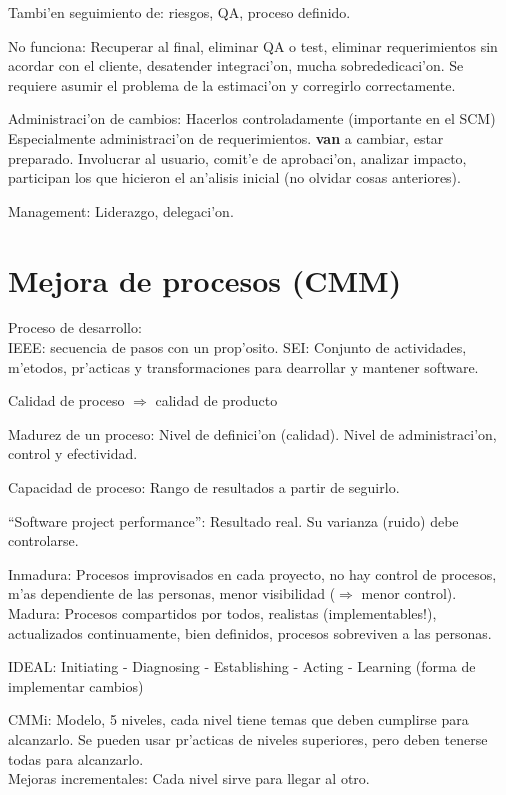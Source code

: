\documentclass[a4paper,spanish]{article}
\newcommand{\tab}[0]{\hspace*{0.5cm}}
\begin{document}
Tambi'en seguimiento de: riesgos, QA, proceso definido.

No funciona: Recuperar al final, eliminar QA o test, eliminar requerimientos
	sin acordar con el cliente, desatender integraci'on, mucha 
	sobrededicaci'on. Se requiere asumir el problema de la estimaci'on y 
	corregirlo correctamente.
	
Administraci'on de cambios: Hacerlos controladamente (importante en el SCM) \\
\tab Especialmente administraci'on de requerimientos. \textbf{van} a cambiar,
	estar preparado. Involucrar al usuario, comit'e de aprobaci'on, analizar
	impacto, participan los que hicieron el an'alisis inicial (no olvidar
	cosas anteriores).
	
Management: Liderazgo, delegaci'on.

\section{Mejora de procesos (CMM)}
	
Proceso de desarrollo: \\
\tab IEEE: secuencia de pasos con un prop'osito.
\tab SEI: Conjunto de actividades, m'etodos, pr'acticas y transformaciones
	para dearrollar y mantener software.

Calidad de proceso $\Rightarrow$ calidad de producto

Madurez de un proceso: Nivel de definici'on (calidad). Nivel de 
	administraci'on, control y efectividad.
	
Capacidad de proceso: Rango de resultados a partir de seguirlo.

``Software project performance'': Resultado real. Su varianza (ruido) debe
	controlarse.

Inmadura: Procesos improvisados en cada proyecto, no hay control de procesos,
	m'as dependiente de las personas, menor visibilidad ($\Rightarrow$ menor
	control). \\
Madura: Procesos compartidos por todos, realistas (implementables!), 
	actualizados continuamente, bien definidos, procesos sobreviven a las
	personas.

IDEAL: Initiating - Diagnosing - Establishing - Acting - Learning (forma de
	implementar cambios)

CMMi: Modelo, 5 niveles, cada nivel tiene temas que deben cumplirse para 
	alcanzarlo. Se pueden usar pr'acticas de niveles superiores, pero deben
	tenerse todas para alcanzarlo. \\
\tab Mejoras incrementales: Cada nivel sirve para llegar al otro.
\end{document}
